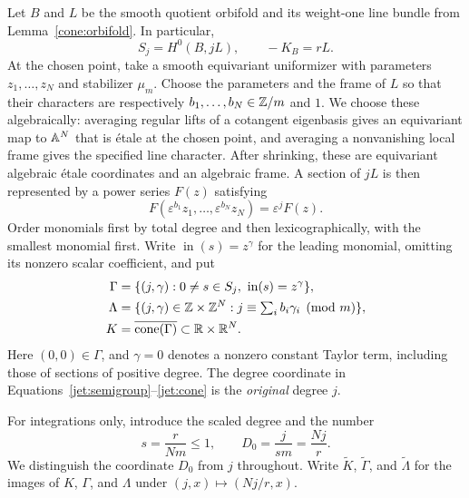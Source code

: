 Let $B$ and $L$ be the smooth quotient orbifold and its weight-one line
bundle from Lemma~\ref{cone:orbifold}. In particular,
\[
 S_j=H^0(B,jL),\qquad -K_B=rL.
\]
At the chosen point, take a smooth equivariant uniformizer with parameters
$z_1,\ldots,z_N$ and stabilizer $\mu_m$. Choose the parameters and the
frame of $L$ so that their characters are respectively
$b_1,\ldots,b_N\in\mathbb Z/m$ and $1$. We choose these algebraically:
averaging regular lifts of a cotangent eigenbasis gives an equivariant
map to $\mathbb A^N$ that is étale at the chosen point, and averaging a
nonvanishing local frame gives the specified line character.
After shrinking, these are equivariant algebraic étale coordinates
and an algebraic frame. A section of $jL$ is then represented
by a power series $F(z)$ satisfying
\[
 F(\varepsilon^{b_1}z_1,\ldots,\varepsilon^{b_N}z_N)
 =\varepsilon^j F(z).
\]
Order monomials first by total degree and then lexicographically, with
the smallest monomial first. Write $\operatorname{in}(s)=z^\gamma$ for
the leading monomial, omitting its nonzero scalar coefficient, and put
\begin{align}
 \Gamma&=\{(j,\gamma):0\ne s\in S_j,
                     \ \operatorname{in}(s)=z^\gamma\},
                     \label{jet:semigroup}\\
 \Lambda&=\{(j,\gamma)\in\mathbb Z\times\mathbb Z^N:
                  j\equiv\textstyle\sum_i b_i\gamma_i\pmod m\},
                     \label{jet:lattice}\\
 K&=\overline{\operatorname{cone}(\Gamma)}
                       \subset\mathbb R\times\mathbb R^N.
                     \label{jet:cone}
\end{align}
Here $(0,0)\in\Gamma$, and $\gamma=0$ denotes a nonzero constant Taylor
term, including those of sections of positive degree. The degree
coordinate in Equations~\eqref{jet:semigroup}--\eqref{jet:cone} is the
\emph{original} degree $j$.

For integrations only, introduce the scaled degree and the number
\begin{equation}\label{jet:scaling}
 s=\frac r{Nm}\le1,\qquad
 D_0=\frac{j}{sm}=\frac{Nj}{r}.
\end{equation}
We distinguish the coordinate $D_0$ from $j$ throughout. Write
$\widetilde K$, $\widetilde\Gamma$, and $\widetilde\Lambda$ for the
images of $K$, $\Gamma$, and $\Lambda$ under
$(j,x)\mapsto(Nj/r,x)$.


